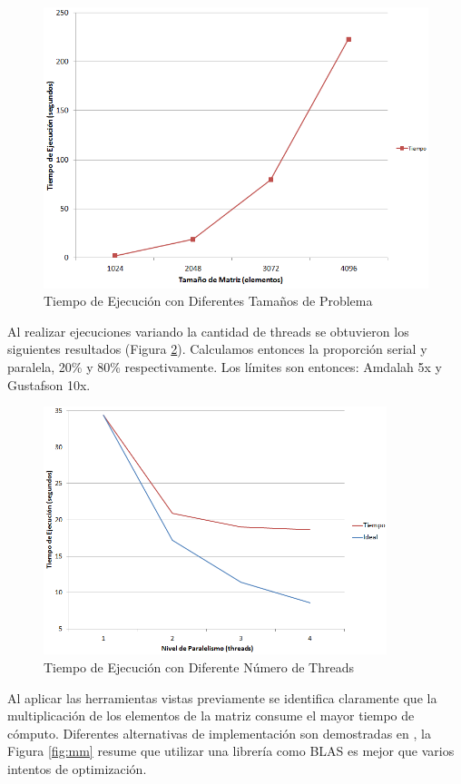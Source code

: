 \documentclass[a4paper]{report}
\begin{document}
\begin{figure}[H]
\centering
\includegraphics[width=\textwidth]{matrix-problem.png}
\caption{Tiempo de Ejecución con Diferentes Tamaños de Problema}
\label{fig:matrix-problem}
\end{figure}

Al realizar ejecuciones variando la cantidad de threads se obtuvieron los siguientes resultados (Figura \ref{fig:matrix-threads}). Calculamos entonces la proporción serial y paralela, 20\% y 80\% respectivamente. Los límites son entonces: Amdalah 5x y Gustafson 10x.

\begin{figure}[H]
\centering
\includegraphics[width=10cm]{matrix-threads.png}
\caption{Tiempo de Ejecución con Diferente Número de Threads}
\label{fig:matrix-threads}
\end{figure}

Al aplicar las herramientas vistas previamente se identifica claramente que la multiplicación de los elementos de la matriz consume el mayor tiempo de cómputo. Diferentes alternativas de implementación son demostradas en \cite{mm-tool}, la 
Figura \ref{fig:mm} resume que utilizar una librería como BLAS es mejor que varios intentos de optimización.
\end{document}
